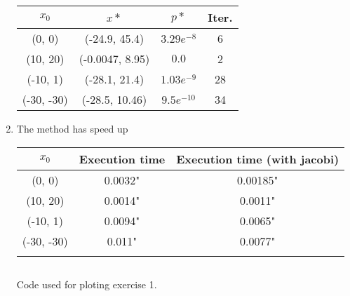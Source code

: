 \documentclass[12pt, a4paper]{article}
\begin{document}
\begin{enumerate}[label={(\alph*)}, ref=\arabic*, leftmargin=0cm]
\begin{table}[H]
\centering
\begin{tabular}{c|c|c|c}
$x_0$                           & $x*$                                & $p*$                              & Iter.                  \\ \hline
(0, 0)                          & (-24.9, 45.4)                       & $3.29e^{-8}$                      & 6                      \\
(10, 20)                        & (-0.0047, 8.95)                     & $0.0$                             & 2                      \\
(-10, 1)                        & (-28.1, 21.4)                       & $1.03e^{-9}$                      & 28                     \\
(-30, -30)                      & (-28.5, 10.46)                      & $9.5e^{-10}$                      & 34                     \\
\end{tabular}
\end{table}

  \item The method has speed up

\begin{table}[H]
\centering
\begin{tabular}{c|c|c}
$x_0$      & Execution time & Execution time (with jacobi) \\ \hline
(0, 0)     & 0.0032"        & 0.00185" \\
(10, 20)   & 0.0014"        & 0.0011" \\
(-10, 1)   & 0.0094"        & 0.0065" \\
(-30, -30) & 0.011"         & 0.0077" \\
  \label{table:exercise1_times}
\end{tabular}
\end{table}

\begin{listing}[H]
  \inputminted[breaklines=true,fontsize=\footnotesize]{python}{../exercise1_plot.py}
  \label{lst:exercise1_plot}
  \caption{Code used for ploting exercise 1.}
\end{listing}

\begin{listing}[H]
  \inputminted[breaklines=true,fontsize=\footnotesize]{python}{../exercise1.py}
  \label{lst:exercise1}
  \caption{}
\end{listing}

\end{enumerate}
\end{document}
